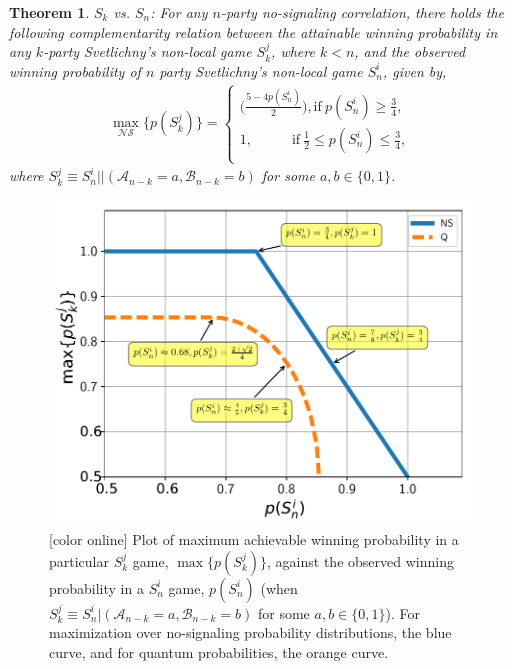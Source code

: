 \documentclass[%
 reprint,
 amsmath,amssymb,
 aps,
]{revtex4-1}
\theoremstyle{plain}
\newtheorem{theorem}{Theorem}
\begin{document}
\begin{theorem} $S_k$ vs. $S_n$:
\label{thm_2} For any $n$-party no-signaling correlation, there holds the following complementarity relation between the attainable winning probability in any $k$-party Svetlichny's non-local game $S_k^j$, where $k<n$, and the observed winning probability of $n$ party Svetlichny's non-local game $S_n^i$, given by,
\begin{eqnarray}
\label{nvn}
  \max_{\mathcal{NS}}\{p({S_{k}^j})\} =
    \begin{cases}
       \bigg( \frac{5-4p(S_{n}^i)}{2} \bigg),  \text{if}\ p(S_{n}^i) \geq \frac{3}{4} , \\
      1, \;\;\;\;\;\;\;\;\;\; \text{if}\ \frac{1}{2}\leq  p(S_{n}^i) \leq \frac{3}{4},\\
    \end{cases}{} 
\end{eqnarray} 
where $S_k^j \equiv S_n^i||(\mathcal{A}_{n-k}=a,\mathcal{B}_{n-k}=b)$ for some $a,b \in \{0,1\}$.
\end{theorem}
\begin{figure}[hbtp]
\includegraphics[scale=0.6]{images/Sk_vs_Sn.pdf}
\caption{[color online] Plot of maximum achievable winning probability in a particular $S_k^j$ game, $\max \{p(S_k^j)\}$,  against the observed winning probability in a $S_n^i$ game, $p(S_n^i)$ (when $S_k^j \equiv S_n^i|(\mathcal{A}_{n-k}=a,\mathcal{B}_{n-k}=b)$ for some $a,b \in \{0,1\}$). For maximization over no-signaling probability distributions, the blue curve, and for quantum probabilities, the orange curve.
}
\label{skvssn}
\end{figure}
\end{document}
